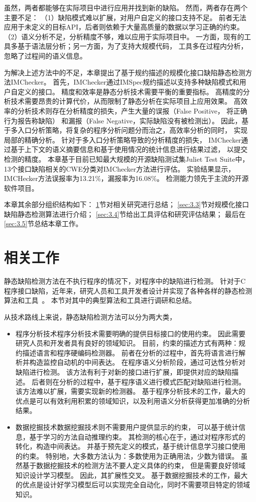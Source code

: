 虽然，两者都能够在实际项目中进行应用并找到新的缺陷。
然而，两者存在两个主要不足：
（1）缺陷模式难以扩展，对用户自定义的接口支持不足。
前者无法应用于未定义的目标API，后者则依赖于大量高质量的数据以学习正确的约束。
（2）语义分析不足，分析精度不够，难以应用于实际项目中。
一方面，现有的工具多基于语法层分析；另一方面，为了支持大规模代码，
工具多在过程内分析，忽略了过程间的语义信息。


为解决上述方法中的不足，本章提出了基于规约描述的规模化接口缺陷静态检测方法IMChecker。
首先，IMChecker通过IMSpec规约描述以支持多种缺陷模式和用户自定义的接口。
精度和效率是静态分析技术需要平衡的重要指标。
高精度的分析技术需要昂贵的计算代价，从而限制了静态分析在实际项目上应用效果。
高效率的分析技术则存在分析精度的损失，产生大量的误报（False Positive， 将正确行为报告称缺陷）
和漏报（False Negative，实际缺陷没有被检测出）。
因此，基于多入口分析策略，将复杂的程序分析问题分而治之，高效率分析的同时，
实现局部的精确分析。
针对于多入口分析策略导致的分析精度的损失，
IMChecker通过基于上下文的语义摘要信息和基于使用情况的统计信息进行结果过滤，
以提交检测的精度。
本章基于目前已知最大规模的开源缺陷测试集Juliet Test Suite中，13个接口缺陷相关的CWE分类对IMChecker方法进行评估。
实验结果显示，IMCHecker方法误报率为13.21\%，漏报率为16.08\%。
检测能力领先于主流的开源软件项目。

本章其余部分组织结构如下：
\ref{sec:3.2}节对相关研究进行总结；
\ref{sec:3.3}节对规模化接口缺陷静态检测算法进行介绍；
\ref{sec:3.4}节给出工具评估和研究评估结果；
最后在\ref{sec:3.5}节总结本章工作。
\section{相关工作}
\label{sec:3.2}

静态缺陷检测方法在不执行程序的情况下，对程序中的缺陷进行检测。
针对于C程序接口缺陷，近年来，研究人员和工具开发者设计并实现了各种各样的静态检测算法和工具~\cite{16-saner-evaluation, survey18}。
本节对其中的典型算法和工具进行调研和总结。

从技术路线上来说，静态缺陷检测方法可以分为两大类，
\begin{itemize}
	\item {\kaishu 程序分析技术}程序分析技术需要明确的提供目标接口的使用约束。
	因此需要研究人员和开发者具有良好的领域知识。
	目前，约束的描述方式有两种：规约描述语言和程序硬编码检测器。
	前者在分析的过程中，首先将语言进行解析并构造监控自动机的中间表达。
	在程序语义分析阶段，通过可达性分析对缺陷进行检测。
	该方法有利于对新的接口进行扩展，即提供对应的缺陷描述。
	后者则在分析的过程中，基于程序语义进行模式匹配对缺陷进行检测。
	该方法难以扩展，需要实现新的检测器。
	基于程序分析技术的工作，最大的优点是可以有效利用积累的领域知识，以及利用语义分析获得更加准确的分析结果。
	\item {\kaishu 数据挖掘技术}数据挖掘技术则不需要用户提供显示的约束，
	可以基于统计信息，基于学习的方法自动推理约束。
	其检测的核心在于，通过对程序形式的转化，构造中间表达。
	并基于预先定义的模式，基于统计信息学习接口使用的约束。
	特别地，大多数方法认为：多数使用为正确用法，少数为错误。
	虽然基于数据挖掘技术的检测方法不要人定义具体的约束，
	但是需要良好领域知识设计学习模型。
	因此，其扩展性交叉。
	基于数据挖掘技术的工作，最大的优点是设计好学习模型后可以实现完全自动化，同时不需要项目特定的领域知识。
\end{itemize}


